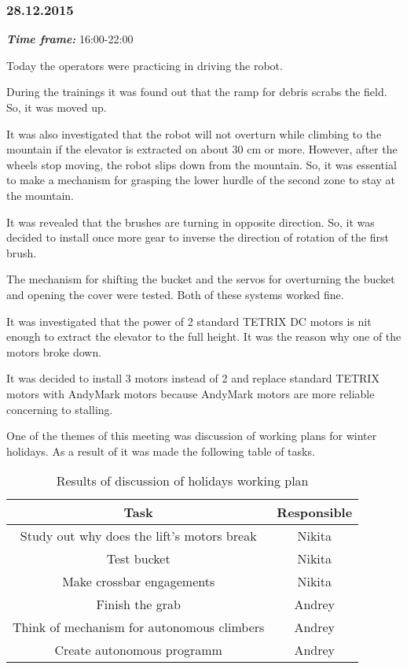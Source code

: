 \subsubsection{28.12.2015}
\textit{\textbf{Time frame:}} 16:00-22:00

Today the operators were practicing in driving the robot.

During the trainings it was found out that the ramp for debris scrabs the field. So, it was moved up.

It was also investigated that the robot will not overturn while climbing to the mountain if the elevator is extracted on about 30 cm or more. However, after the wheels stop moving, the robot slips down from the mountain. So, it was essential to make a mechanism for grasping the lower hurdle of the second zone to stay at the mountain.

It was revealed that the brushes are turning in opposite direction. So, it was decided to install once more gear to inverse the direction of rotation of the first brush.

The mechanism for shifting the bucket and the servos for overturning the bucket and opening the cover were tested. Both of these systems worked fine.

It was investigated that the power of 2 standard TETRIX DC motors is nit enough to extract the elevator to the full height. It was the reason why one of the motors broke down.

It was decided to install 3 motors instead of 2 and replace standard TETRIX motors with AndyMark motors because AndyMark motors are more reliable concerning to stalling.

One of the themes of this meeting was discussion of working plans for winter holidays. As a result of it was made the following table of tasks.
\begin{table}[H]
	\caption{Results of discussion of holidays working plan}
	\label{tabular:meetingSPB28.12}
	\begin{center}
		\begin{tabular}{c|c}
		  Task & Responsible \\
		  \hline
		  Study out why does the lift's motors break & Nikita \\
		  Test bucket & Nikita \\
		  Make crossbar engagements	& Nikita \\
		  Finish the grab & Andrey \\
		  Think of mechanism for autonomous climbers & Andrey \\
		  Create autonomous programm & Andrey \\
	    \end{tabular}
	\end{center}
\end{table}

